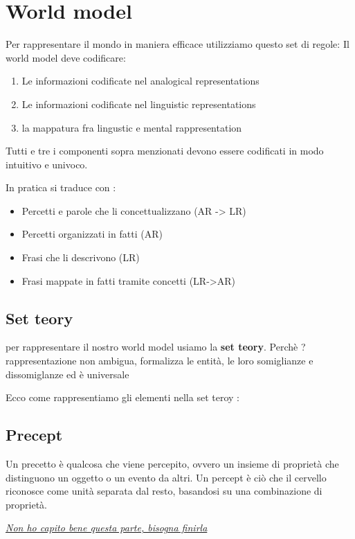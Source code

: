 \documentclass [12pt, letterpaper]{article}
\begin{document}
\section{World model}

Per rappresentare il mondo in maniera efficace utilizziamo questo set di regole:
Il world model deve codificare:
\begin{enumerate}
	\item Le informazioni codificate nel analogical representations
	\item Le informazioni codificate nel linguistic representations
	\item la mappatura fra lingustic e mental rappresentation
\end{enumerate}

Tutti e tre i componenti sopra menzionati devono essere codificati in modo intuitivo e univoco.


In pratica si traduce con :

\begin{itemize}
	\item Percetti e parole che li concettualizzano (AR -> LR)
	\item Percetti organizzati in fatti (AR)
	\item Frasi che li descrivono (LR)
	\item Frasi mappate in fatti tramite concetti (LR->AR)
\end{itemize}


\subsection{Set teory}
	per rappresentare il nostro world model usiamo la \textbf{set teory}. Perchè ? rappresentazione non ambigua, formalizza le entità, le loro somiglianze e dissomiglanze ed è universale
	
	
	Ecco come rappresentiamo gli elementi nella set teroy : 
	
	\subsection{Precept}
	Un precetto è qualcosa che viene percepito, ovvero un insieme di proprietà che distinguono un oggetto o un evento da altri. Un percept è ciò che il cervello riconosce come unità separata dal resto, basandosi su una combinazione di proprietà. 
	
	
	\underline{\textit{Non ho capito bene questa parte, bisogna finirla}}
	
\end{document}
